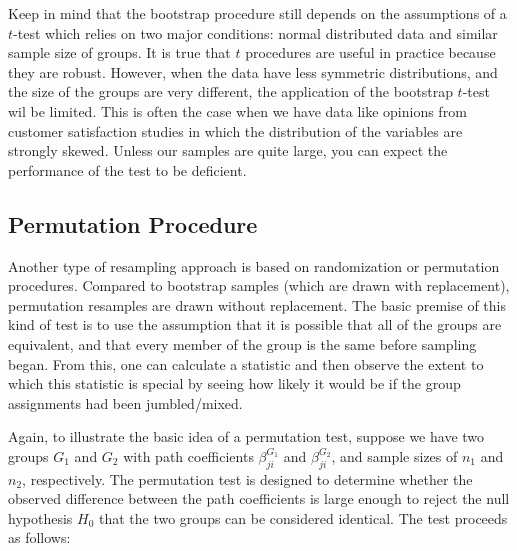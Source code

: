 \documentclass[12pt]{book}\usepackage{graphicx, color}
\begin{document}
Keep in mind that the bootstrap procedure still depends on the assumptions of a $t$-test which relies on two major conditions: normal distributed data and similar sample size of groups. It is true that $t$ procedures are useful in practice because they are robust. However, when the data have less symmetric distributions, and the size of the groups are very different, the application of the bootstrap $t$-test wil be limited. This is often the case when we have data like opinions from customer satisfaction studies in which the distribution of the variables are strongly skewed. Unless our samples are quite large, you can expect the performance of the test to be deficient.

 


\subsection{Permutation Procedure}
Another type of resampling approach is based on randomization or permutation procedures. Compared to bootstrap samples (which are drawn with replacement), permutation resamples are drawn without replacement. The basic premise of this kind of test is to use the assumption that it is possible that all of the groups are equivalent, and that every member of the group is the same before sampling began. From this, one can calculate a statistic and then observe the extent to which this statistic is special by seeing how likely it would be if the group assignments had been jumbled/mixed.

Again, to illustrate the basic idea of a permutation test, suppose we have two groups $G_1$ and $G_2$ with path coefficients $\beta_{ji}^{G_1}$ and $\beta_{ji}^{G_2}$, and sample sizes of $n_1$ and $n_2$, respectively. The permutation test is designed to determine whether the observed difference between the path coefficients is large enough to reject the null hypothesis $H_0$ that the two groups can be considered identical. The test proceeds as follows:
\end{document}
